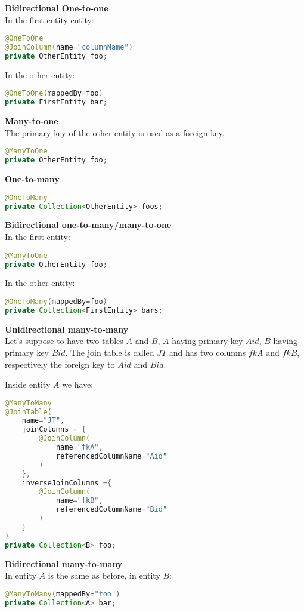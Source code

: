 \textbf{Bidirectional One-to-one}\\
In the first entity entity:
\begin{lstlisting}[language=Java]
@OneToOne
@JoinColumn(name="columnName")
private OtherEntity foo;
\end{lstlisting}

In the other entity:
\begin{lstlisting}[language=Java]
@OneToOne(mappedBy=foo)
private FirstEntity bar;
\end{lstlisting}

\textbf{Many-to-one}\\
The primary key of the other entity is used as a foreign key.
\begin{lstlisting}[language=Java]
@ManyToOne
private OtherEntity foo;
\end{lstlisting}

\textbf{One-to-many}\\
\begin{lstlisting}[language=Java]
@OneToMany
private Collection<OtherEntity> foos;
\end{lstlisting}

\textbf{Bidirectional one-to-many/many-to-one}\\
In the first entity:
\begin{lstlisting}[language=Java]
@ManyToOne
private OtherEntity foo;
\end{lstlisting}

In the other entity:
\begin{lstlisting}[language=Java]
@OneToMany(mappedBy=foo)
private Collection<FirstEntity> bars;
\end{lstlisting}

\textbf{Unidirectional many-to-many}\\
Let's suppose to have two tables $A$ and $B$, $A$ having primary key $Aid$, $B$ having primary key $Bid$.
The join table is called $JT$ and has two columns $fkA$ and $fkB$, respectively the foreign key to $Aid$ and $Bid$.

Inside entity $A$ we have:
\begin{lstlisting}[language=Java]
@ManyToMany
@JoinTable(
    name="JT",
    joinColumns = {
        @JoinColumn(
            name="fkA",
            referencedColumnName="Aid"
        )
    },
    inverseJoinColumns ={
        @JoinColumn(
            name="fkB",
            referencedColumnName="Bid"
        )
    }
)
private Collection<B> foo;
\end{lstlisting}

\textbf{Bidirectional many-to-many}\\
In entity $A$ is the same as before, in entity $B$:
\begin{lstlisting}[language=Java]
@ManyToMany(mappedBy="foo")
private Collection<A> bar;
\end{lstlisting}